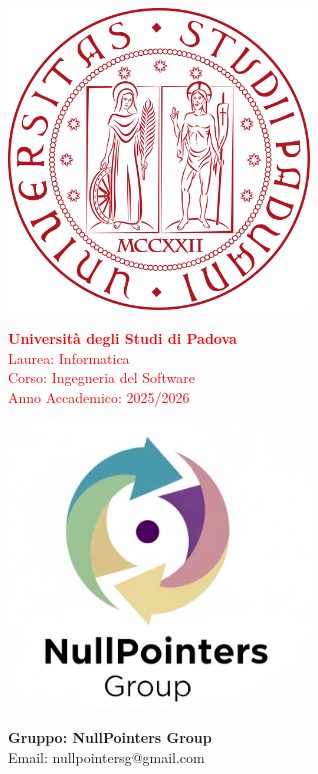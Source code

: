 \documentclass{article}
\begin{document}
	\begin{minipage}{0.4\textwidth}
		\includegraphics[width=0.6\textwidth]{logo_unipd}
	\end{minipage}
	\begin{minipage}{0.55\textwidth}
		\textcolor{red}{\textbf{Università degli Studi di Padova}} \\
		\textcolor{red}{Laurea: Informatica} \\
		\textcolor{red}{Corso: Ingegneria del Software} \\
		\textcolor{red}{Anno Accademico: 2025/2026}
	\end{minipage}
	
	\begin{minipage}{0.4\textwidth}
		\includegraphics[width=0.6\textwidth]{logo_gruppo}
	\end{minipage}
	\begin{minipage}{0.55\textwidth}
		\textbf{Gruppo: NullPointers Group} \\
		Email: \textsf{nullpointersg@gmail.com}
	\end{minipage}
	
\end{document}
